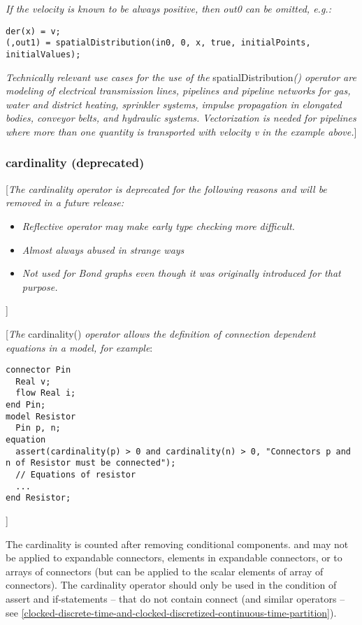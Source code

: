 \emph{If the velocity is known to be always positive, then out0 can be
omitted, e.g.:}
\begin{lstlisting}[language=modelica]
der(x) = v;
(,out1) = spatialDistribution(in0, 0, x, true, initialPoints, initialValues);
\end{lstlisting}
\emph{Technically relevant use cases for the use of the}
spatialDistribution\emph{() operator are modeling of electrical
transmission lines, pipelines and pipeline networks for gas, water and
district heating, sprinkler systems, impulse propagation in elongated
bodies, conveyor belts, and hydraulic systems. Vectorization is needed
for pipelines where more than one quantity is transported with velocity
v in the example above.}{]}

\subsubsection{cardinality (deprecated)}

{[}\emph{The cardinality operator is deprecated for the following
reasons and will be removed in a future release:}

\begin{itemize}
\item
  \emph{Reflective operator may make early type checking more
  difficult.}
\item
  \emph{Almost always abused in strange ways}
\item
  \emph{Not used for Bond graphs even though it was originally
  introduced for that purpose.}
\end{itemize}

{]}

{[}\emph{The} cardinality() \emph{operator allows the definition of
connection dependent equations in a model, for example}:

\begin{lstlisting}[language=modelica]
connector Pin
  Real v;
  flow Real i;
end Pin;
model Resistor
  Pin p, n;
equation
  assert(cardinality(p) > 0 and cardinality(n) > 0, "Connectors p and n of Resistor must be connected");
  // Equations of resistor
  ...
end Resistor;
\end{lstlisting}

{]}

The cardinality is counted after removing conditional components. and
may not be applied to expandable connectors, elements in expandable
connectors, or to arrays of connectors (but can be applied to the scalar
elements of array of connectors). The cardinality operator should only
be used in the condition of assert and if-statements -- that do not
contain connect (and similar operators -- see \autoref{clocked-discrete-time-and-clocked-discretized-continuous-time-partition}).

